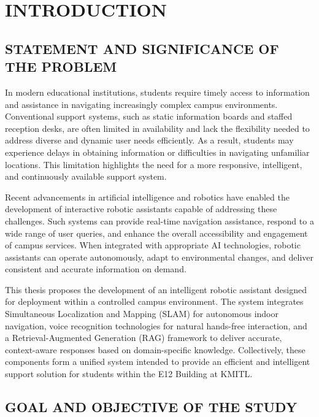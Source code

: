 \chapter{INTRODUCTION}

\section{STATEMENT AND SIGNIFICANCE OF THE PROBLEM}

In modern educational institutions, students require timely access to information and assistance in navigating increasingly complex campus environments. Conventional support systems, such as static information boards and staffed reception desks, are often limited in availability and lack the flexibility needed to address diverse and dynamic user needs efficiently. As a result, students may experience delays in obtaining information or difficulties in navigating unfamiliar locations. This limitation highlights the need for a more responsive, intelligent, and continuously available support system.

Recent advancements in artificial intelligence and robotics have enabled the development of interactive robotic assistants capable of addressing these challenges. Such systems can provide real-time navigation assistance, respond to a wide range of user queries, and enhance the overall accessibility and engagement of campus services. When integrated with appropriate AI technologies, robotic assistants can operate autonomously, adapt to environmental changes, and deliver consistent and accurate information on demand.

This thesis proposes the development of an intelligent robotic assistant designed for deployment within a controlled campus environment. The system integrates Simultaneous Localization and Mapping (SLAM) for autonomous indoor navigation, voice recognition technologies for natural hands-free interaction, and a Retrieval-Augmented Generation (RAG) framework to deliver accurate, context-aware responses based on domain-specific knowledge. Collectively, these components form a unified system intended to provide an efficient and intelligent support solution for students within the E12 Building at KMITL.

\section{GOAL AND OBJECTIVE OF THE STUDY}

